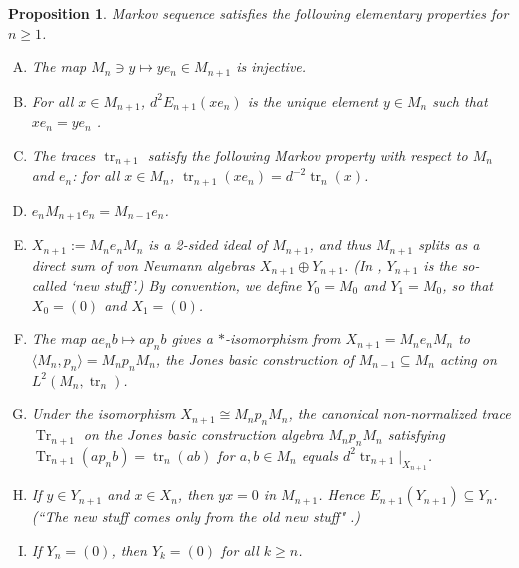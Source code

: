 \documentclass[11pt]{article}
\theoremstyle{plain}
\newtheorem{prop}[thm]{Proposition}
\theoremstyle{definition}
\DeclareMathOperator{\Tr}{Tr}
\DeclareMathOperator{\tr}{tr}
\begin{document}
\begin{prop} Markov sequence satisfies the following elementary properties for $n\geq 1$.
\begin{enumerate}[(A)]
\item
\label{EP:injective}
The map $M_{n}\ni y\mapsto ye_n \in M_{n+1}$ is injective.

\item
\label{EP:UniquePullDown}
For all $x\in M_{n+1}$, $d^{2}E_{n+1}(x e_n)$ is the unique element $y\in M_n$ such that $x e_n = ye_n$ \cite[Lem.~1.2]{MR860811}.

\item
\label{EP:MarkovTraces}
The traces $\tr_{n+1}$ satisfy the following \emph{Markov property} with respect to $M_n$ and $e_n$: for all $x\in M_n$, $\tr_{n+1}(xe_n) = d^{-2} \tr_n(x)$.

\item
\label{EP:CompressM_{n+1}}
$e_n M_{n+1}e_n = M_{n-1}e_n$.

\item
\label{EP:2SidedIdeal}
$X_{n+1}:=M_n e_n M_n$ is a 2-sided ideal of $M_{n+1}$, and thus $M_{n+1}$ splits as a direct sum of von Neumann algebras $X_{n+1}\oplus Y_{n+1}$.
(In \cite[Thm.~4.1.4 and Thm.~4.6.3]{MR999799}, $Y_{n+1}$ is the so-called `new stuff'.)
By convention, we define $Y_0 = M_0$ and $Y_1 = M_0$, so that $X_0 = (0)$ and $X_1 = (0)$.

\item
\label{EP:BasicContruction}
The map $ae_n b\mapsto ap_n b$ gives a $*$-isomorphism from $X_{n+1}=M_n e_n M_n$ to $\langle M_n , p_n\rangle=M_np_nM_n$, the Jones basic construction of $M_{n-1} \subseteq M_n$ acting on $L^2(M_n,\tr_n)$.

\item
\label{EP:OtherMarkovDef}
Under the isomorphism $X_{n+1} \cong M_n p_n M_n$, the canonical non-normalized trace $\Tr_{n+1}$ on the Jones basic construction algebra $M_np_nM_n$ satisfying $\Tr_{n+1}(ap_nb) = \tr_n(ab)$ for $a,b\in M_n$ equals $d^2 \tr_{n+1}|_{X_{n+1}}$.

\item
\label{EP:NewStuff}
If $y\in Y_{n+1}$ and $x\in X_{n}$, then $yx = 0$ in $M_{n+1}$.
Hence $E_{n+1}(Y_{n+1}) \subseteq Y_{n}$.
(``The new stuff comes only from the old new stuff" \cite{MR999799}.)

\item
\label{EP:FiniteDepth}
If $Y_n =(0)$, then $Y_{k} = (0)$ for all $k\geq n$.

\end{enumerate}
\end{prop}
\end{document}
